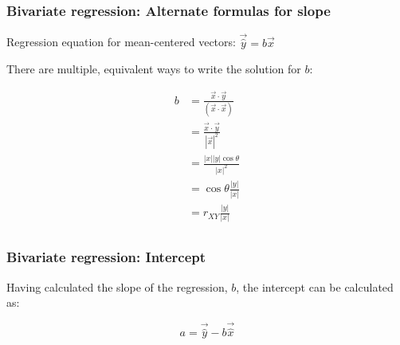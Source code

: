 \documentclass{beamer}
\begin{document}

\begin{frame}
  \frametitle{Bivariate regression: Alternate formulas for slope}

Regression equation for mean-centered vectors: $\vec{\widehat{y}} = b\vec{x}$

There are multiple, equivalent ways to write the solution for $b$:

%
\begin{align*}
b &= \frac{\vec{x} \cdot \vec{y}}{(\vec{x} \cdot \vec{x})} \\
  &= \frac{\vec{x} \cdot \vec{y}}{|\vec{x}|^2}    \\
  &= \frac{|x||y| \cos \theta}{|x|^2} \\
  &= \cos \theta \frac{|y|}{|x|} \\
  &= r_{XY} \frac{|y|}{|x|} \\
\end{align*}


\end{frame}



\begin{frame}
  \frametitle{Bivariate regression: Intercept}

Having calculated the slope of the regression, $b$, the intercept can be calculated as:

\[
a = \vec{\widehat{y}} - b\vec{\widehat{x}}
\]

\end{frame}
\end{document}
